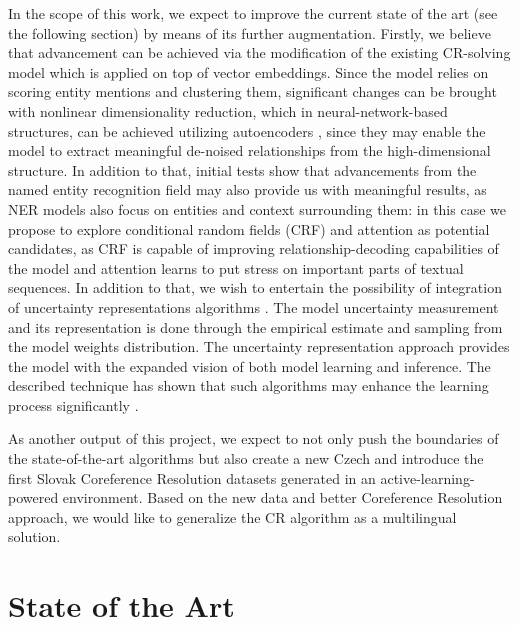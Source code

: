 In the scope of this work, we expect to improve the current state of the art (see the following section) by means of its further augmentation. 
Firstly, we believe that advancement can be achieved via the modification of the existing CR-solving model which is applied on top of vector embeddings. 
Since the model relies on scoring entity mentions and clustering them, significant changes can be brought with nonlinear dimensionality reduction, which in neural-network-based structures, can be achieved utilizing autoencoders \cite{autoencoders-Zabalza2016,autoencoders-Sahay2019}, since they may enable the model to extract meaningful de-noised relationships from the high-dimensional structure. 
In addition to that, initial tests show that advancements from the named entity recognition field may also provide us with meaningful results, as NER models also focus on entities and context surrounding them: in this case we propose to explore conditional random fields (CRF) \cite{ner-Strakova2019,ner-Zhanming2019,ner-Zhanming2019} and attention \cite{ner-Yamada2020} as potential candidates, as CRF is capable of improving relationship-decoding capabilities of the model and attention learns to put stress on important parts of textual sequences. 
In addition to that, we wish to entertain the possibility of integration of uncertainty representations algorithms \cite{lakshminarayanan2016simple, gal2017deep,welling2011bayesian}. 
The model uncertainty measurement and its representation is done through the empirical estimate and sampling from the model weights distribution. 
The uncertainty representation approach provides the model with the expanded vision of both model learning and inference. 
The described technique has shown that such algorithms may enhance the learning process significantly \cite{ovadia2019can}.


As another output of this project, we expect to not only push the boundaries of the state-of-the-art algorithms but also create a new Czech and introduce the first Slovak Coreference Resolution datasets generated in an active-learning-powered environment.
Based on the new data and better Coreference Resolution approach, we would like to generalize the CR algorithm as a multilingual solution.


\section{State of the Art}\label{sec:sota}

